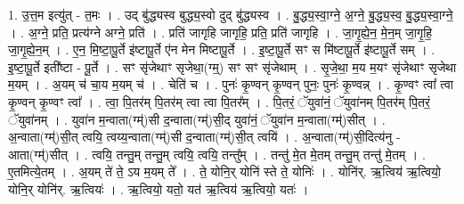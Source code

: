 \documentclass[17pt]{extarticle}
\begin{document}
1. उ॒त्त॒म इत्यु॑त् - त॒मः । . उद् बु॑द्ध्यस्व बुद्ध्य॒स्वो दुद् बु॑द्ध्यस्व । . बु॒द्ध्य॒स्वा॒ग्ने॒ अ॒ग्ने॒ बु॒द्ध्य॒स्व॒ बु॒द्ध्य॒स्वा॒ग्ने॒ । . अ॒ग्ने॒ प्रति॒ प्रत्य॑ग्ने अग्ने॒ प्रति॑ । . प्रति॑ जागृहि जागृहि॒ प्रति॒ प्रति॑ जागृहि । . जा॒गृ॒ह्ये॒न॒ मे॒न॒म् जा॒गृ॒हि॒ जा॒गृ॒ह्ये॒न॒म् । . ए॒न॒ मि॒ष्टा॒पू॒र्ते इ॑ष्टापू॒र्ते ए॑न मेन मिष्टापू॒र्ते । . इ॒ष्टा॒पू॒र्ते सꣳ स मि॑ष्टापू॒र्ते इ॑ष्टापू॒र्ते सम् । . इ॒ष्टा॒पू॒र्ते इती᳚ष्टा - पू॒र्ते । . सꣳ सृ॑जेथाꣳ सृजेथा॒(ग्म्॒) सꣳ सꣳ सृ॑जेथाम् । . सृ॒जे॒था॒ म॒य म॒यꣳ सृ॑जेथाꣳ सृजेथा म॒यम् । . अ॒यम् च॑ चा॒य म॒यम् च॑ । . चेति॑ च । . पुनः॑ कृ॒ण्वन् कृ॒ण्वन् पुनः॒ पुनः॑ कृ॒ण्वन्न् । . कृ॒ण्वꣳ त्वा᳚ त्वा कृ॒ण्वन् कृ॒ण्वꣳ त्वा᳚ । . त्वा॒ पि॒तर॑म् पि॒तर॑म् त्वा त्वा पि॒तर᳚म् । . पि॒तरं॒ ॅयुवा॑नं॒ ॅयुवा॑नम् पि॒तर॑म् पि॒तरं॒ ॅयुवा॑नम् । . युवा॑न म॒न्वाता(ग्म्॑)सी द॒न्वाता(ग्म्॑)सी॒द् युवा॑नं॒ ॅयुवा॑न म॒न्वाता(ग्म्॑)सीत् । . अ॒न्वाता(ग्म्॑)सी॒त् त्वयि॒ त्वय्य॒न्वाता(ग्म्॑)सी द॒न्वाता(ग्म्॑)सी॒त् त्वयि॑ । . अ॒न्वाता(ग्म्॑)सी॒दित्य॑नु - आता(ग्म्॑)सीत् । . त्वयि॒ तन्तु॒म् तन्तु॒म् त्वयि॒ त्वयि॒ तन्तु᳚म् । . तन्तु॑ मे॒त मे॒तम् तन्तु॒म् तन्तु॑ मे॒तम् । . ए॒तमित्ये॒तम् । . अ॒यम् ते॑ ते॒ ऽय म॒यम् ते᳚ । . ते॒ योनि॒र् योनि॑ स्ते ते॒ योनिः॑ । . योनि॑र्. ऋ॒त्विय॑ ऋ॒त्वियो॒ योनि॒र् योनि॑र्. ऋ॒त्वियः॑ । . ऋ॒त्वियो॒ यतो॒ यत॑ ऋ॒त्विय॑ ऋ॒त्वियो॒ यतः॑ । \newline
\end{document}
